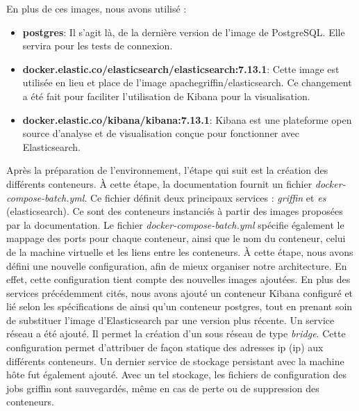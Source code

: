 En plus de ces images, nous avons utilis\'e :
\begin{itemize}[parsep=0cm,itemsep=0cm]
\item \textbf{postgres}:  Il s'agit l\`a, de la derni\`ere version de l'image de PostgreSQL. Elle servira pour les tests de connexion.
\item \textbf{docker.elastic.co/elasticsearch/elasticsearch:7.13.1}: Cette image est utilis\'ee en lieu et place de l'image apachegriffin/elasticsearch. Ce changement a \'et\'e fait pour faciliter l'utilisation de Kibana pour la visualisation.
\item \textbf{docker.elastic.co/kibana/kibana:7.13.1}: Kibana est une plateforme open source d'analyse et de visualisation conçue pour fonctionner avec Elasticsearch.
\end{itemize}
\vspace{0.15cm}


Apr\`es la pr\'eparation de l'environnement, l'\'etape qui suit est la cr\'eation des diff\'erents conteneurs. \`A cette \'etape, la documentation \cite{ApacheGriffinDocDocker} fournit un fichier \emph{docker-compose-batch.yml}. Ce fichier d\'efinit deux principaux services : \emph{griffin} et \emph{es} (elasticsearch). Ce sont des conteneurs instanci\'es \`a partir des images propos\'ees par la documentation. Le fichier \emph{docker-compose-batch.yml} sp\'ecifie \'egalement le mappage des ports pour chaque conteneur, ainsi que le nom du conteneur, celui de la machine virtuelle et les liens entre les conteneurs. \`A cette \'etape, nous avons d\'efini une nouvelle configuration, afin de mieux organiser notre architecture. En effet, cette configuration tient compte des nouvelles images ajout\'ees. En plus des services pr\'ec\'edemment cit\'es, nous avons ajout\'e un conteneur Kibana configur\'e et li\'e selon les sp\'ecifications de \cite{EsKibana} ainsi qu'un conteneur postgres, tout en prenant soin de substituer l'image d'Elasticsearch par une version plus r\'ecente. Un service r\'eseau a \'et\'e ajout\'e. Il permet la cr\'eation d'un sous r\'eseau de type \textit{bridge}. Cette configuration permet d'attribuer de façon statique des adresses \acrshort{ip} (\acrlong{ip}) aux diff\'erents conteneurs. Un dernier service de stockage persistant avec la machine h\^ote fut \'egalement ajout\'e. Avec un tel stockage, les fichiers de configuration des jobs griffin sont sauvegard\'es, m\^eme en cas de perte ou de suppression des conteneurs.
\\

